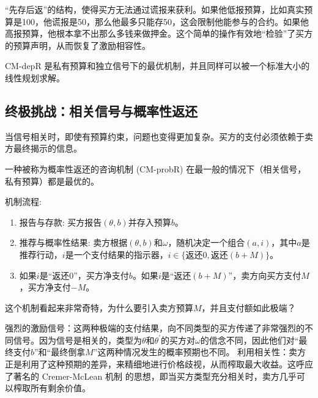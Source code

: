 “先存后返”的结构，使得买方无法通过谎报来获利。如果他低报预算，比如真实预算是100，他谎报是50，那么他最多只能存50，这会限制他能参与的合约。如果他高报预算，他根本拿不出那么多钱来做押金。这个简单的操作有效地“检验”了买方的预算声明，从而恢复了激励相容性。

CM-depR 是私有预算和独立信号下的最优机制，并且同样可以被一个标准大小的线性规划求解。

\subsection{终极挑战：相关信号与概率性返还}

当信号相关时，即使有预算约束，问题也变得更加复杂。买方的支付必须依赖于卖方最终揭示的信息。

一种被称为概率性返还的咨询机制 (CM-probR) 在最一般的情况下（相关信号，私有预算）都是最优的。

机制流程:

\begin{enumerate}
    \item 报告与存款: 买方报告$(\theta,b)$并存入预算$b$。
    \item 推荐与概率性结果: 卖方根据$(\theta,b)$和$\omega$，随机决定一个组合$(a,i)$，其中$a$是推荐行动，$i$是一个支付结果的指示器，$i \in \{\text{返还}0, \text{返还}(b+M)\}$。
    \item 如果$i$是“返还0”，买方净支付$b$。如果$i$是“返还$(b+M)$”，卖方向买方支付$M$，买方净支付$-M$。
\end{enumerate}

这个机制看起来非常奇特，为什么要引入卖方预算$M$，并且支付额如此极端？

强烈的激励信号：这两种极端的支付结果，向不同类型的买方传递了非常强烈的不同信号。因为信号是相关的，类型为$\theta$和$\theta^\prime$的买方对$\omega$的信念不同，因此他们对“最终支付$b$”和“最终倒拿$M$”这两种情况发生的概率预期也不同。
利用相关性：卖方正是利用了这种预期的差异，来精细地进行价格歧视，从而榨取最大收益。这呼应了著名的 Cremer-McLean 机制 的思想，即当买方类型充分相关时，卖方几乎可以榨取所有剩余价值。